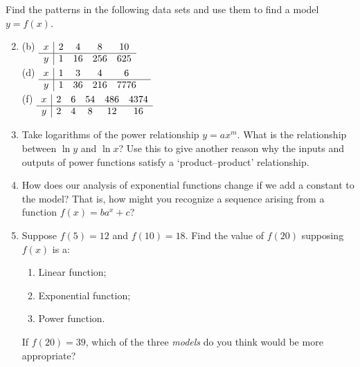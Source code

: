 \begin{exercises}{}{}
	\exstart Find the patterns in the following data sets and use them to find a model $y=f(x)$.
	\begin{enumerate}\setcounter{enumi}{1}
	  \item[]
		(b)\lstsp
		$\begin{array}[t]{c|cccc}
			x&2&4&8&10\\\hline
			y&1&16&256&625
		\end{array}$\\[5pt]
		(d)\lstsp
		$\begin{array}[t]{c|ccccc}
			x&1&3&4&6\\\hline
			y&1&36&216&7776&
		\end{array}$\\[5pt]
		(f)\lstsp
		$\begin{array}[t]{c|ccccc}
			x&2&6&54&486&4374\\\hline
			y&2&4&8&12&16
		\end{array}$
	
	
		\item Take logarithms of the power relationship $y=ax^m$. What is the relationship between $\ln y$ and $\ln x$? Use this to give another reason why the inputs and outputs of power functions satisfy a `product--product' relationship.
		
		\item How does our analysis of exponential functions change if we add a constant to the model? That is, how might you recognize a sequence arising from a function $f(x)=ba^x+c$?
	  
	  \item Suppose $f(5)=12$ and $f(10)=18$. Find the value of $f(20)$ supposing $f(x)$ is a:
	  \begin{enumerate}
	    \item Linear function;
	    \item Exponential function;
	    \item Power function.
	  \end{enumerate}
	  If $f(20)=39$, which of the three \emph{models} do you think would be more appropriate?
	\end{enumerate}
\end{exercises}


